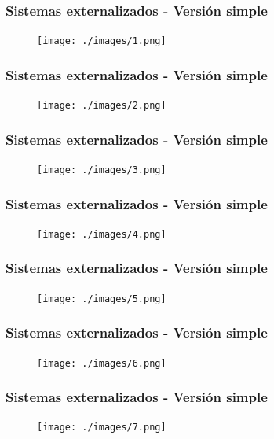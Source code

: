 \documentclass{beamer}
\begin{document}
\begin{frame}[c,fragile]
	\frametitle{Sistemas externalizados - Versión simple}
	\begin{figure}[H]
		\centering
		\texttt{[image: ./images/1.png]}\\
	\end{figure}
\end{frame}
\begin{frame}[c,fragile]
	\frametitle{Sistemas externalizados - Versión simple}
	\begin{figure}[H]
		\centering
		\texttt{[image: ./images/2.png]}\\
	\end{figure}
\end{frame}
\begin{frame}[c,fragile]
	\frametitle{Sistemas externalizados - Versión simple}
	\begin{figure}[H]
		\centering
		\texttt{[image: ./images/3.png]}\\
	\end{figure}
\end{frame}
\begin{frame}[c,fragile]
	\frametitle{Sistemas externalizados - Versión simple}
	\begin{figure}[H]
		\centering
		\texttt{[image: ./images/4.png]}\\
	\end{figure}
\end{frame}
\begin{frame}[c,fragile]
	\frametitle{Sistemas externalizados - Versión simple}
	\begin{figure}[H]
		\centering
		\texttt{[image: ./images/5.png]}\\
	\end{figure}
\end{frame}
\begin{frame}[c,fragile]
	\frametitle{Sistemas externalizados - Versión simple}
	\begin{figure}[H]
		\centering
		\texttt{[image: ./images/6.png]}\\
	\end{figure}
\end{frame}
\begin{frame}[c,fragile]
	\frametitle{Sistemas externalizados - Versión simple}
	\begin{figure}[H]
		\centering
		\texttt{[image: ./images/7.png]}\\
	\end{figure}
\end{frame}
\end{document}
